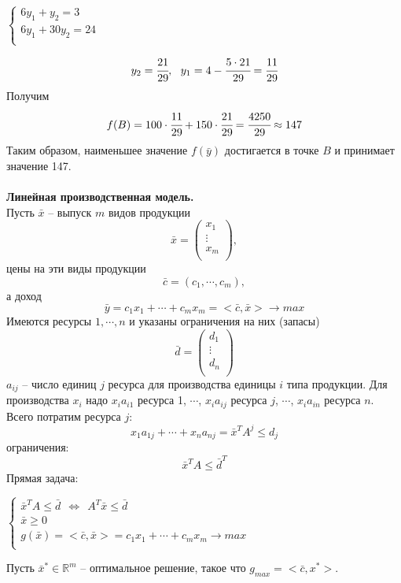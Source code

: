 \documentclass[12pt]{article}
\theoremstyle{definition}
\numberwithin{equation}{section}
\begin{document}
	\begin{center}
		$
		\left\{
		\begin{array}{lcl}
		6y_1+y_2=3\\
		6y_1+30y_2=24\\
		\end{array}
		\right.
		$
	\end{center}
	$$y_2=\cfrac{21}{29},~~y_1=4-\cfrac{5\cdot 21}{29}=\cfrac{11}{29}$$
	Получим
	$$f(B)=100\cdot \cfrac{11}{29}+150\cdot \cfrac{21}{29}=\cfrac{4250}{29}\approx 147$$
	Таким образом, наименьшее значение $f(\bar y)$ достигается в точке $B$ и принимает значение 147.\\
	\\
	\textbf{Линейная производственная модель.}\\
	Пусть $\bar x$ -- выпуск $m$ видов продукции
	\[\bar x=\begin{pmatrix}
	x_1\\
	\vdots\\
	x_m\\
	\end{pmatrix},\]
	цены на эти виды продукции $$\bar c =(c_1, \cdots, c_m),$$
	а доход $$\bar y=c_1x_1+\cdots +c_mx_m=<\bar c, \bar x> \to max$$
	Имеются ресурсы $1, \cdots, n$ и указаны ограничения на них (запасы)
	\[\bar d=\begin{pmatrix}
	d_1\\
	\vdots\\
	d_n\\
	\end{pmatrix}\]
	$a_{ij}$ -- число единиц $j$ ресурса для производства единицы $i$ типа продукции. Для производства $x_i$ надо $x_ia_{i1}$ ресурса 1, $\cdots$, $x_ia_{ij}$ ресурса $j$, $\cdots$, $x_ia_{in}$ ресурса $n$.\\
	Всего потратим ресурса $j$: $$x_1a_{1j}+\cdots+x_na_{nj}=\bar x^T A^j \leqslant d_j$$
	ограничения: $$\bar x^TA\leqslant\bar d^T$$
	Прямая задача:
	\begin{center}
		$
		\left\{
		\begin{array}{lcl}
		\bar x^TA\leqslant \bar d ~~\Leftrightarrow ~~A^T\bar x\leqslant \bar d\\
		\bar x \geqslant 0\\
		g(\bar x)=<\bar c, \bar x>=c_1x_1+\cdots+c_mx_m \to max\\
		\end{array}
		\right.
		$
	\end{center}
	Пусть $\bar x^*\in \mathbb{R}^m$ -- оптимальное решение, такое что $g_{max}=<\bar c, x^*>$.\\
\end{document}

